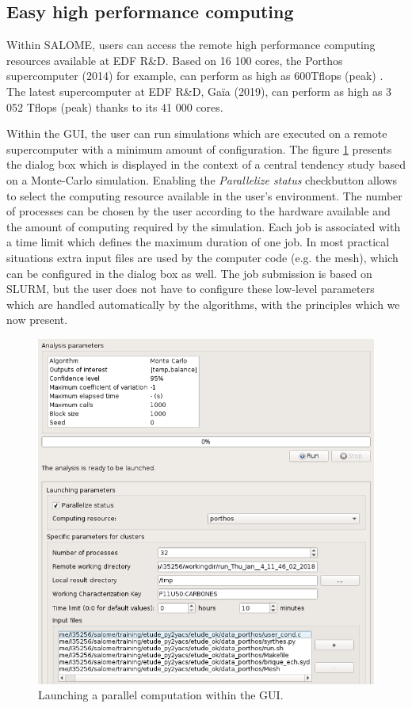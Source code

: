\documentclass{uncecomp2019}
\begin{document}

\subsection{Easy high performance computing}
\label{sec-hpceasy}

Within SALOME, users can access the remote high performance computing 
resources available at EDF R\&D. 
Based on 16 100 cores, the Porthos supercomputer (2014) for example, can perform as high as 600Tflops (peak) \cite{Top500Porthos}. 
The latest supercomputer at EDF R\&D, Gaïa (2019), can perform as high as 3 052 Tflops (peak) \cite{Top500Gaia} 
thanks to its 41 000 cores. 

Within the GUI, the user can run simulations which are executed on a remote supercomputer with 
a minimum amount of configuration. 
The figure \ref{fig-hpcsalome} presents the dialog box which is displayed in the 
context of a central tendency study based on a Monte-Carlo simulation. 
Enabling the \emph{Parallelize status} checkbutton allows to select the 
computing resource available in the user's environment. 
The number of processes can be chosen by the user according to the hardware available 
and the amount of computing required by the simulation. 
Each job is associated with a time limit which defines the maximum 
duration of one job. 
In most practical situations extra input files are used by the computer code (e.g. the mesh), 
which can be configured in the dialog box as well. 
The job submission is based on SLURM, but the user does not have to configure these 
low-level parameters which are handled automatically by the algorithms, with the principles 
which we now present. 

\begin{figure}
\centering
\includegraphics[width=\textwidth]{figures/SALOME-OpenTURNS-config-HPC-focus.png}
\caption{Launching a parallel computation within the GUI.}
\label{fig-hpcsalome}
\end{figure}
\end{document}
